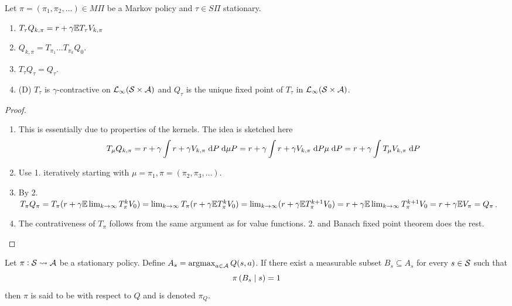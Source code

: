 \begin{prop}
  Let $\pi = (\pi_1, \pi_2, \dots) \in M\Pi$ be a Markov policy
  and $\tau \in S\Pi$ stationary.
  \leavevmode
  \begin{enumerate}
    \item $T_\tau Q_{k, \pi}
      = r + \gamma \mathbb{E} T_\tau V_{k, \pi}$
    \item $Q_{k, \pi} = T_{\pi_1} \dots T_{\pi_k} Q_0$. 
    \item $T_\tau Q_\tau = Q_\tau$.
    \item (D) $T_\tau$ is $\gamma$-contractive on
      $\mathcal{L}_\infty(\mathcal{S}\times\mathcal{A})$
      and $Q_\tau$ is the unique fixed point of $T_\tau$ in
      $\mathcal{L}_\infty(\mathcal{S}\times\mathcal{A})$.
  \end{enumerate}
  \label{prop:TQ}
\end{prop}
\begin{proof}
  \leavevmode
  \begin{enumerate}
    \item This is essentially due to properties of the kernels. The idea is
      sketched here
      \begin{align*}
	T_\mu Q_{k, \pi} = r + \gamma \int r + \gamma V_{k, \pi}
	\; \mathrm{d} P \; \mathrm{d} \mu P
	= r + \gamma \int r + \gamma V_{k, \pi} \; \mathrm{d} P \mu \; \mathrm{d} P
	= r + \gamma \int T_\mu V_{k, \pi} \; \mathrm{d} P
      \end{align*}
    \item Use 1. iteratively starting with
      $\mu = \pi_1, \pi = (\pi_2, \pi_3, \dots)$.
    \item By 2. $T_\pi Q_\pi = T_\pi (r + \gamma \mathbb{E} \lim_{k\to\infty} T_\pi^k V_0)
      = \lim_{k\to\infty} T_\pi (r + \gamma \mathbb{E} T_\pi^k V_0)
      = \lim_{k\to\infty} (r + \gamma \mathbb{E} T_\pi^{k+1} V_0)
      = r + \gamma \mathbb{E} \lim_{k\to\infty} T^{k+1}_\pi V_0
      = r + \gamma \mathbb{E} V_\pi = Q_\pi$.
    \item The contrativeness of $T_\pi$ follows from the same argument as for
      value functions. 2. and Banach fixed point theorem does the rest.
  \end{enumerate}
\end{proof}

\begin{defn}
  Let $\pi : \mathcal{S} \leadsto \mathcal{A}$ be a stationary policy. Define
  $A_s = \operatorname*{argmax}_{a \in \mathcal{A}} Q(s, a)$.
  If there exist a measurable subset $B_s \subseteq A_s$
  for every $s \in \mathcal{S}$ such that
  \[ \pi \left( B_s \;\middle\vert\; s \right) = 1 \]
  then $\pi$ is said to be  with respect to $Q$ and is
  denoted $\pi_Q$.
\end{defn}

